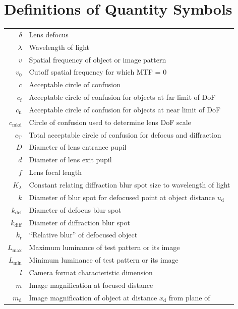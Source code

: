 \documentclass[11pt, oneside]{scrartcl}   	%
\begin{document}
\section{Definitions of Quantity Symbols}
\begin{center}
{\small
\begin{tabular}{r@{~=~}l}
$\delta$ & Lens defocus     \\
$\lambda$ & Wavelength of light     \\
$v$ & Spatial frequency of object or image pattern     \\
$v_0$ & Cutoff spatial frequency for which MTF = 0      \\
$c$ & Acceptable circle of confusion     \\
$c_\mathrm{f}$ & Acceptable circle of confusion for objects at far limit of DoF     \\
$c_\mathrm{n}$ & Acceptable circle of confusion for objects at near limit of
        DoF     \\
$c_\mathrm{mkd}$ & Circle of confusion used to determine lens DoF scale     \\
$c_\mathrm{T}$ & Total acceptable circle of confusion for defocus and
        diffraction     \\
$D$ & Diameter of lens entrance pupil      \\
$d$ & Diameter of lens exit pupil     \\
$f$ & Lens focal length     \\
$K_\lambda$ & Constant relating diffraction blur spot size to
              wavelength of light     \\
$k$ & Diameter of blur spot for defocused point at object distance
      $u_\mathrm{d}$     \\
$k_\mathrm{def}$ & Diameter of defocus blur spot     \\
$k_\mathrm{diff}$ & Diameter of diffraction blur spot     \\
$k_\mathrm{r}$ & “Relative blur” of defocused object     \\
$L_\mathrm{max}$ & Maximum luminance of test pattern or its image      \\
$L_\mathrm{min}$ & Minimum luminance of test pattern or its image     \\
$l$ & Camera format characteristic dimension\\
$m$ & Image magnification at  focused distance     \\
$m_\mathrm{d}$ & Image magnification of object at distance $x_\mathrm{d}$ from plane of

\end{tabular}}
\end{center}
\end{document}
